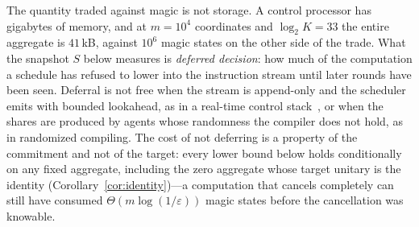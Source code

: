 \documentclass[aps,prx,twocolumn,superscriptaddress,nofootinbib,longbibliography]{revtex4-2}
\theoremstyle{plain}
\theoremstyle{definition}
\theoremstyle{remark}
\begin{document}
The quantity traded against magic is not storage. A control processor has gigabytes of memory, and at $m=10^4$ coordinates and $\log_2K=33$ the entire aggregate is $41$\,kB, against $10^6$ magic states on the other side of the trade. What the snapshot $S$ below measures is \emph{deferred decision}: how much of the computation a schedule has refused to lower into the instruction stream until later rounds have been seen. Deferral is not free when the stream is append-only and the scheduler emits with bounded lookahead, as in a real-time control stack~\cite{Caune,Fowler}, or when the shares are produced by agents whose randomness the compiler does not hold, as in randomized compiling. The cost of not deferring is a property of the commitment and not of the target: every lower bound below holds conditionally on any fixed aggregate, including the zero aggregate whose target unitary is the identity (Corollary~\ref{cor:identity})---a computation that cancels completely can still have consumed $\Theta(m\log(1/\varepsilon))$ magic states before the cancellation was knowable.
\end{document}
